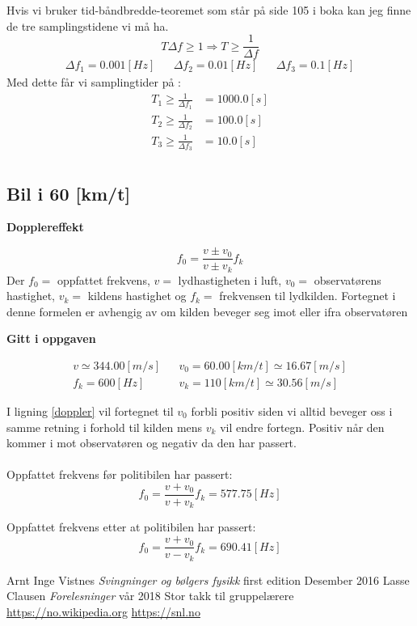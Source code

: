 \documentclass[a4paper,12pt,norsk]{article}
\begin{document}
Hvis vi bruker tid-båndbredde-teoremet som står på side 105 i boka \cite{boka} kan jeg finne de tre samplingstidene vi må ha.
$$
T\Delta f \geq 1 \Rightarrow T \geq \frac{1}{\Delta f}
$$
\begin{align*}
\Delta f_1 = 0.001 [Hz] && \Delta f_2 = 0.01[Hz] && \Delta f_3 = 0.1[Hz]
\end{align*}
Med dette får vi samplingtider på :
\begin{align*}
T_1 \geq \frac{1}{\Delta f_1} &=1000.0 [s] \\
T_2 \geq \frac{1}{\Delta f_2} &=100.0 [s]\\
T_3 \geq \frac{1}{\Delta f_3} &=10.0 [s]\\
\end{align*}



\subsection{Bil i 60 [km/t]}


\begin{center}
\textbf{Dopplereffekt}
\end{center}
\begin{equation}
f_0 = \frac{v \pm v_0}{v\pm v_k}f_k
\label{doppler}
\end{equation}
Der $f_0=$ oppfattet frekvens, $v=$ lydhastigheten i luft, $v_0=$ observatørens hastighet, $v_k=$ kildens hastighet og $f_k=$ frekvensen til lydkilden. Fortegnet i denne formelen er avhengig av om kilden beveger seg imot eller ifra observatøren\\

\begin{center}
\textbf{Gitt i oppgaven}
\end{center}
\begin{align*}
v \simeq 344.00 [m/s] && v_0 = 60.00[km/t] \simeq 16.67[m/s]\\
f_k = 600[Hz] && v_k = 110 [km/t] \simeq 30.56 [m/s]
\end{align*}

I ligning \ref{doppler} vil fortegnet til $v_0$ forbli positiv siden vi alltid beveger oss i samme retning i forhold til kilden mens $v_k$ vil endre fortegn. Positiv når den kommer i mot observatøren og negativ da den har passert.\\ \\

Oppfattet frekvens før politibilen har passert:
$$
f_0 = \frac{v + v_0}{v + v_k}f_k = 577.75[Hz]
$$


Oppfattet frekvens etter at politibilen har passert:
$$
f_0 = \frac{v + v_0}{v - v_k}f_k = 690.41 [Hz]
$$


\begin{thebibliography}{}
	Arnt Inge Vistnes
	\textit{Svingninger og bølgers fysikk}
	first edition
	Desember 2016
	Lasse Clausen
	\textit{Forelesninger}
	vår 2018
	Stor takk til gruppelærere
	\url{https://no.wikipedia.org}
	\url{https://snl.no}

\end{thebibliography}
\end{document}
